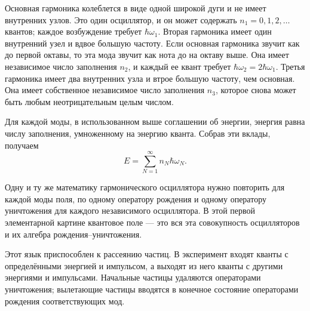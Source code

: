 Основная гармоника колеблется в виде одной широкой дуги и не имеет внутренних узлов. Это один осциллятор, и он может содержать \(n_1=0,1,2,\ldots\) квантов; каждое возбуждение требует \(\hbar\omega_1\). Вторая гармоника имеет один внутренний узел и вдвое большую частоту. Если основная гармоника звучит как до первой октавы, то эта мода звучит как нота до на октаву выше. Она имеет независимое число заполнения \(n_2\), и каждый ее квант требует \(\hbar\omega_2=2\hbar\omega_1\). Третья гармоника имеет два внутренних узла и втрое большую частоту, чем основная. Она имеет собственное независимое число заполнения \(n_3\), которое снова может быть любым неотрицательным целым числом.

Для каждой моды, в использованном выше соглашении об энергии, энергия равна числу заполнения, умноженному на энергию кванта. Собрав эти вклады, получаем
\begin{equation}
E=\sum_{N=1}^{\infty} n_N\hbar\omega_N.
\end{equation}

Одну и ту же математику гармонического осциллятора нужно повторить для каждой моды поля, по одному оператору рождения и одному оператору уничтожения для каждого независимого осциллятора. В этой первой элементарной картине квантовое поле — это вся эта совокупность осцилляторов и их алгебра рождения--уничтожения.

Этот язык приспособлен к рассеянию частиц. В эксперимент входят кванты с определёнными энергией и импульсом, а выходят из него кванты с другими энергиями и импульсами. Начальные частицы удаляются операторами уничтожения; вылетающие частицы вводятся в конечное состояние операторами рождения соответствующих мод.

\begin{classroomqa}
\end{classroomqa}
